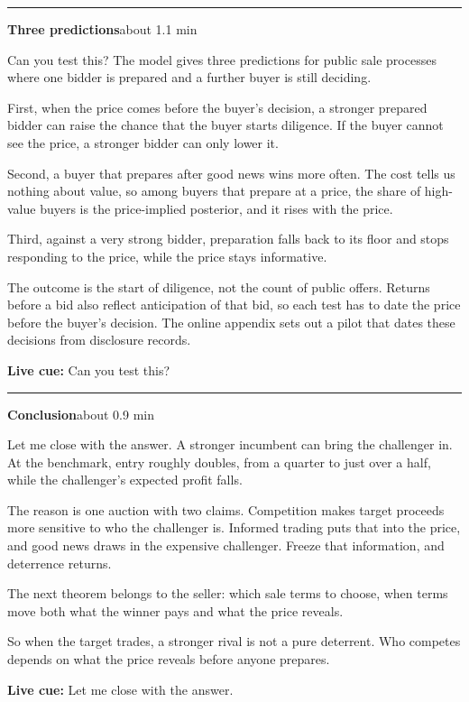 \documentclass[11pt]{article}
\newcommand{\Cue}[1]{\par\nobreak\smallskip\noindent
  \textcolor{ScriptGray}{\footnotesize\textbf{Live cue:} #1}\par}
\newcommand{\scriptframe}[3]{%
  \Needspace{9\baselineskip}%
  \par\medskip\noindent\textcolor{ScriptBlue}{\rule{\linewidth}{0.55pt}}%
  \par\smallskip\noindent
  \textbf{#1}\hfill\textcolor{ScriptGray}{\small #2}\par\smallskip
  #3\par}
\begin{document}
\scriptframe{Three predictions}{about 1.1 min}{%
  Can you test this? The model gives three predictions for public sale
  processes where one bidder is prepared and a further buyer is still deciding.

  First, when the price comes before the buyer's decision, a stronger prepared
  bidder can raise the chance that the buyer starts diligence. If the buyer
  cannot see the price, a stronger bidder can only lower it.

  Second, a buyer that prepares after good news wins more often. The cost tells
  us nothing about value, so among buyers that prepare at a price, the share of
  high-value buyers is the price-implied posterior, and it rises with the price.

  Third, against a very strong bidder, preparation falls back to its floor and
  stops responding to the price, while the price stays informative.

  The outcome is the start of diligence, not the count of public offers. Returns
  before a bid also reflect anticipation of that bid, so each test has to date
  the price before the buyer's decision. The online appendix sets out a pilot
  that dates these decisions from disclosure records.
  \Cue{Can you test this?}
}

\begin{samepage}
\scriptframe{Conclusion}{about 0.9 min}{%
  Let me close with the answer. A stronger incumbent can bring the challenger
  in. At the benchmark, entry roughly doubles, from a quarter to just over a
  half, while the challenger's expected profit falls.

  The reason is one auction with two claims. Competition makes target proceeds
  more sensitive to who the challenger is. Informed trading puts that into the
  price, and good news draws in the expensive challenger. Freeze that
  information, and deterrence returns.

  The next theorem belongs to the seller: which sale terms to choose, when terms
  move both what the winner pays and what the price reveals.

  So when the target trades, a stronger rival is not a pure deterrent. Who
  competes depends on what the price reveals before anyone prepares.
  \Cue{Let me close with the answer.}
}
\end{samepage}
\end{document}
